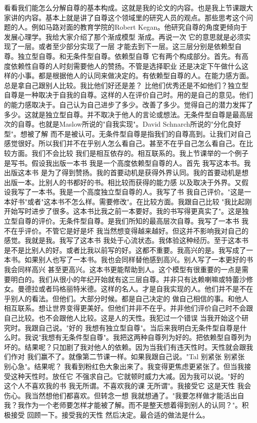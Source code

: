 看看我们能怎么分解自尊的基本构成。这就是我的论文的内容。也是我上节课跟大家讲的内容。基本上就是讲了自尊这个领域里的研究人员的观点。那些思考这个问题的人。例如马路对面的教育学院的Robert Kegan。他研究自尊的角度更倾向于发展心理学。我给大家介绍了那个渐成模型 渐成。再说一次 它的意思就是必须实现了一层。或者至少部分实现了一层 才能去到下一层。这三层分别是依赖型自尊。独立型自尊。和无条件型自尊。依赖型自尊 它有两个构成部分。首先。有高度依赖性自尊的人时刻需要他人的赞扬。不管是选择职业 还是决定下午做什么这样的小事。都是根据他人的认同来做决定的。有依赖型自尊的人。在能力感方面。总是拿自己跟别人比较。我比他们好还是差？ 比他们优秀还是不如他们？独立型自尊是一种取决于自我的自尊。这样的人在评价自己时。用的是自己的意见。他们的能力感取决于。自己认为自己进步了多少。改善了多少。觉得自己的潜力发挥了多少。这就是独立型自尊。并不取决于他人的言论或想法。无条件型自尊是最高层次的自尊。也就是Maslow所说的"自我实现"。David Schnarch所说的"分化良好型"。想被了解 而不是被认可。无条件型自尊是指我们的自尊高到。让我们对自己感觉很好。所以我们并不在乎别人怎么看自己。甚至不在乎自己怎么看自己。在比较方面。我们不会比较 我们是相互依存的。相互联系的。我上节课举的一个例子是写书。假设我出版一本书 我是一个高度依赖型自尊的人。首先 我写这本书。我出版这本书 是为了得到赞扬。我的首要动机是获得外界认同。我的首要动机是想出版一本。比别人的书都好的书。相比较而获得的能力感 以及取决于外界。又假设我写了一本书。我是一个高度独立型自尊的人。我写了书 我自己评价。"这是一本好书"或者"这本书不怎么样。需要修改"。在比较方面。我跟自己比较 "我比起刚开始写时进步了很多。这本书比我之前一本要好。我的书写得更真实了"。这是独立型自尊的评价。无条件型自尊。是我们所知的最高层次自尊。我写了一本书 我不在乎评价。不管它是好是坏 我当然想变得越来越好。但这并不影响我对自己的感觉。我就是我。我写了这本书 我处于心流状态。我体验这种经历。至于这本书是不是比别人的好。或者比我以前写的好。这都不重要。我高兴的是。我写成了一本书。如果别人也写了一本书。我也会同样替他感到高兴。别人写了一本更好的书 我会同样高兴 甚至更高兴。这本书更能帮助到人。这个模型有很重要的一点是需要明白的。我们从很小的年纪开始就有这三层自尊。并非只有达赖喇嘛或特蕾沙修女。曼德拉或者玛格丽特米德。这样的名人。才是自我实现的人。他们并不是不在乎别人的看法。但他们。大部分时候。都是自己决定的 做自己相信的事。和他人相互联系。想让世界变得更美好。但他们并非不在乎。并非他们评价自己时不会跟自己比较。也不会跟他人比较。这是人的天性。我犯过一个错误 当我开始这个研究时。我跟自己说。"好的 我想有独立型自尊"。当后来我明白无条件型自尊是什么时。我说"我想有无条件型自尊"。我把这两种自尊列为好的。把依赖型自尊列为坏的。结果呢？只加剧了我对他人的依赖。因为当我们有违天性时。天性就会跟我们作对 我们赢不了。就像第二节课一样。如果我跟自己说。"Tal 别紧张 别紧张 别心急"。结果呢？ 我看到粉红色大象出来了。我变得更焦虑更紧张了。但当我接受这种天性时。放任它 不强求自己。它就顿时威力大减。因为我可以说。"好的 这个人不喜欢我的书 我无所谓。不喜欢我的课 无所谓"。我接受它 这是天性 我会伤心。我当然想他们都喜欢。但转念一想 我就想通了。"我要怎样做才能活出自我？我作为一个老师要怎样才能被了解。而不是整天想着得到别人的认同？"。积极接受 回顾一下。接受我的天性 然后决定。最合适的做法是什么。 

